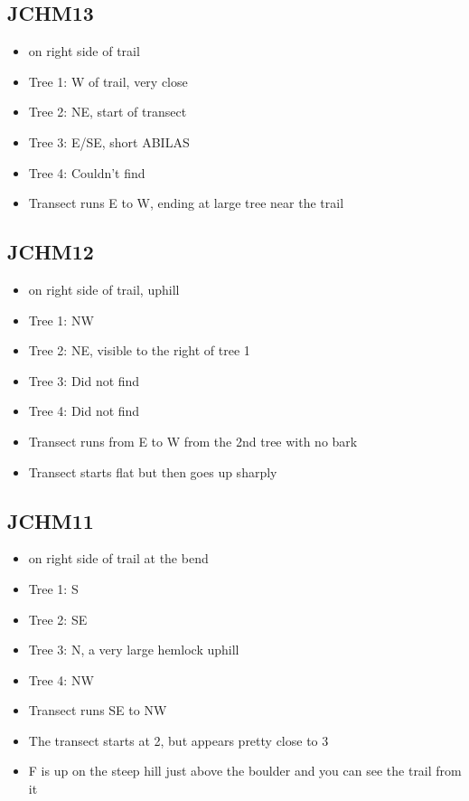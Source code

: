 \documentclass{article}\usepackage[]{graphicx}\usepackage[]{color}
\begin{document}
\subsection{JCHM13}
\begin{itemize}
\item on right side of trail
\item Tree 1: W of trail, very close
\item Tree 2: NE, start of transect
\item Tree 3: E/SE, short ABILAS
\item Tree 4: Couldn't find
\item Transect runs E to W, ending at large tree near the trail
\end{itemize}

\subsection{JCHM12}
\begin{itemize}
\item on right side of trail, uphill
\item Tree 1: NW
\item Tree 2: NE, visible to the right of tree 1
\item Tree 3: Did not find
\item Tree 4: Did not find
\item Transect runs from E to W from the 2nd tree with no bark
\item Transect starts flat but then goes up sharply
\end{itemize}

\subsection{JCHM11}
\begin{itemize}
\item on right side of trail at the bend
\item Tree 1: S
\item Tree 2: SE
\item Tree 3: N, a very large hemlock uphill
\item Tree 4: NW
\item Transect runs SE to NW
\item The transect starts at 2, but appears pretty close to 3
\item F is up on the steep hill just above the boulder and you can see the trail from it
\end{itemize}
\end{document}

